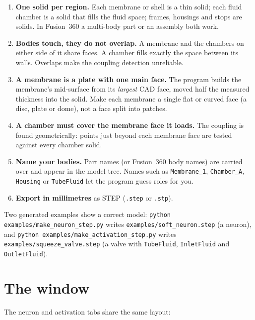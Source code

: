 \documentclass[11pt,a4paper]{article}
\newcommand{\code}[1]{\texttt{#1}}
\begin{document}
\begin{enumerate}
\item \textbf{One solid per region.} Each membrane or shell is a thin solid; each fluid chamber is a solid that
  fills the fluid space; frames, housings and stops are solids. In Fusion~360 a multi-body part or an assembly both
  work.
\item \textbf{Bodies touch, they do not overlap.} A membrane and the chambers on either side of it share faces. A
  chamber fills exactly the space between its walls. Overlaps make the coupling detection unreliable.
\item \textbf{A membrane is a plate with one main face.} The program builds the membrane's mid-surface from its
  \emph{largest} CAD face, moved half the measured thickness into the solid. Make each membrane a single flat or
  curved face (a disc, plate or dome), not a face split into patches.
\item \textbf{A chamber must cover the membrane face it loads.} The coupling is found geometrically: points just
  beyond each membrane face are tested against every chamber solid.
\item \textbf{Name your bodies.} Part names (or Fusion~360 body names) are carried over and appear in the model
  tree. Names such as \code{Membrane\_1}, \code{Chamber\_A}, \code{Housing} or \code{TubeFluid} let the program
  guess roles for you.
\item \textbf{Export in millimetres} as STEP (\code{.step} or \code{.stp}).
\end{enumerate}

\begin{tip}
Two generated examples show a correct model: \code{python examples/make\_neuron\_step.py} writes
\code{examples/soft\_neuron.step} (a neuron), and \code{python examples/make\_activation\_step.py} writes
\code{examples/squeeze\_valve.step} (a valve with \code{TubeFluid}, \code{InletFluid} and \code{OutletFluid}).
\end{tip}

\section{The window}

The neuron and activation tabs share the same layout:
\end{document}
